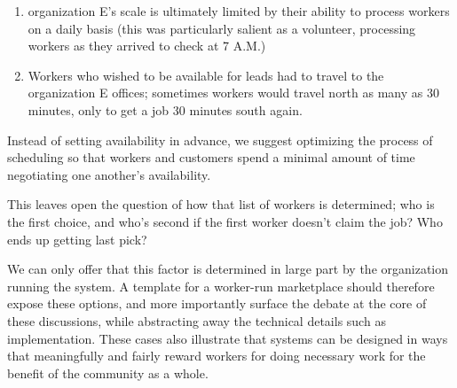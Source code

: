 \begin{enumerate} \itemsep0pt \parskip0pt
  \item organization E's scale is ultimately limited by their ability to process workers on a daily basis (this was particularly salient as a volunteer, processing workers as they arrived to check at 7 A.M.)
  \item Workers who wished to be available for leads had to travel to the organization E offices; sometimes workers would travel north as many as 30 minutes, only to get a job 30 minutes south again.
\end{enumerate}

Instead of setting availability in advance, we suggest optimizing the process of scheduling so that workers and customers spend a minimal amount of time negotiating one another's availability.

This leaves open the question of how that list of workers is determined;
who is the first choice, and who's second if the first worker doesn't claim the job?
Who ends up getting last pick?

We can only offer that this factor is determined in large part by the organization running the system.
A template for a worker-run marketplace should therefore expose these options,
and more importantly surface the debate at the core of these discussions,
while abstracting away the technical details such as implementation.
These cases also illustrate that systems can be designed in ways that meaningfully and fairly reward workers for doing necessary work for the benefit of the community as a whole.

